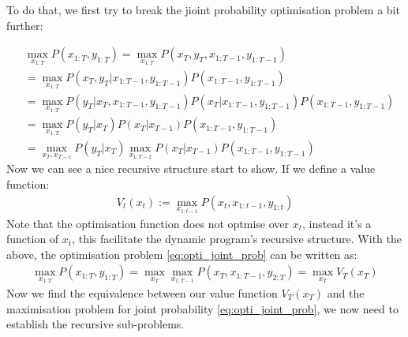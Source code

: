\documentclass{article} [10pt] %
\begin{document}
To do that, we first try to break the jioint probability optimisation problem a bit further:

\begin{align}
	&\max_{x_{1:T}}P(x_{1:T},  y_{1:T}) = \max_{x_{1:T}}P(x_T, y_T,  x_{1:T-1}, y_{1:T-1}) \label{eq:opti_joint_prob}\\
	&= \max_{x_{1:T}}P(x_T, y_T | x_{1:T-1}, y_{1:T-1})P(x_{1:T-1}, y_{1:T-1})\\
		&= \max_{x_{1:T}}P(y_T |x_T, x_{1:T-1}, y_{1:T-1})P(x_T|  x_{1:T-1}, y_{1:T-1})P(x_{1:T-1}, y_{1:T-1})\\
		&= \max_{x_{1:T}}P(y_T | x_T)P(x_T|  x_{T-1})P(x_{1:T-1}, y_{1:T-1})\\
		&= \max_{x_T, x_{T-1}}P(y_T | x_T)\max_{x_{1:T-2}}P(x_T|  x_{T-1})P(x_{1:T-1}, y_{1:T-1}) 
\end{align}
Now we can see a nice recursive structure start to show. If we define a value function:
\begin{align}
	V_{t}(x_t) := \max_{x_{1:t-1}}P(x_t, x_{1:t-1}, y_{1:t})
\end{align}
Note that the optimisation function does not optmise over $x_t$, instead it's a function of $x_t$, this facilitate the dynamic program's recursive structure. With the above, the optimisation problem \eqref{eq:opti_joint_prob} can be written as:
\begin{align}
	\max_{x_{1:T}}P(x_{1:T}, y_{1:T})=\max_{x_T}\max_{x_{1:T-1}}P(x_T,  x_{1:T-1}, y_{2:T})=\max_{x_T}V_T(x_T)
\end{align}
Now we find the equivalence between our value function $V_T(x_T)$ and the maximisation problem for joint probability  \eqref{eq:opti_joint_prob}, we now need to establish the recursive sub-problems. 
\end{document}
